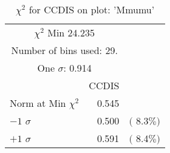  \begin{table}[h!]\centering
 {\small{
 \begin{tabular}{||l||r||r||}
 \hline
 \hline
\multicolumn{2}{||c||}{$\chi^{2}$ Min  24.235} & \\
 \multicolumn{2}{||c||}{Number of bins used:   29.} & \\
\multicolumn{2}{||c||}{One $\sigma$:    0.914} & \\
 \hline
 \hline
    & CCDIS & \\
Norm at Min $\chi^{2}$  &   0.545 & \\
$-1$ $\sigma$ &   0.500  &  $($  8.3$\%)$  \\
$+1$ $\sigma$ &   0.591  &  $($  8.4$\%)$  \\
 \hline
 \hline
 \end{tabular}
 \caption{$\chi^{2}$ for CCDIS on plot: 'Mmumu'}
 \label{tab-chiccdis}
 }}
 \end{table}
 \endinput
